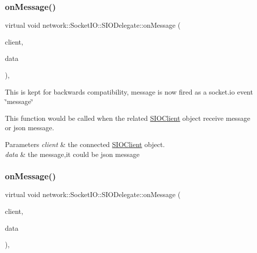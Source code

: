 \subsubsection{\texorpdfstring{on\+Message()}{onMessage()}\hspace{0.1cm}{\footnotesize\ttfamily [1/2]}}
{\footnotesize\ttfamily virtual void network\+::\+Socket\+I\+O\+::\+S\+I\+O\+Delegate\+::on\+Message (\begin{DoxyParamCaption}\item[{\hyperlink{classnetwork_1_1SIOClient}{S\+I\+O\+Client} $\ast$}]{client,  }\item[{const std\+::string \&}]{data }\end{DoxyParamCaption})\hspace{0.3cm}{\ttfamily [inline]}, {\ttfamily [virtual]}}

This is kept for backwards compatibility, message is now fired as a socket.\+io event \char`\"{}message\char`\"{}

This function would be called when the related \hyperlink{classnetwork_1_1SIOClient}{S\+I\+O\+Client} object receive message or json message.


\begin{DoxyParams}{Parameters}
{\em client} & the connected \hyperlink{classnetwork_1_1SIOClient}{S\+I\+O\+Client} object. \\
\hline
{\em data} & the message,it could be json message \\
\hline
\end{DoxyParams}
\mbox{\label{classnetwork_1_1SocketIO_1_1SIODelegate_aa498be5838a65bdb5a42707de71a5d2a}} 
\subsubsection{\texorpdfstring{on\+Message()}{onMessage()}\hspace{0.1cm}{\footnotesize\ttfamily [2/2]}}
{\footnotesize\ttfamily virtual void network\+::\+Socket\+I\+O\+::\+S\+I\+O\+Delegate\+::on\+Message (\begin{DoxyParamCaption}\item[{\hyperlink{classnetwork_1_1SIOClient}{S\+I\+O\+Client} $\ast$}]{client,  }\item[{const std\+::string \&}]{data }\end{DoxyParamCaption})\hspace{0.3cm}{\ttfamily [inline]}, {\ttfamily [virtual]}}

